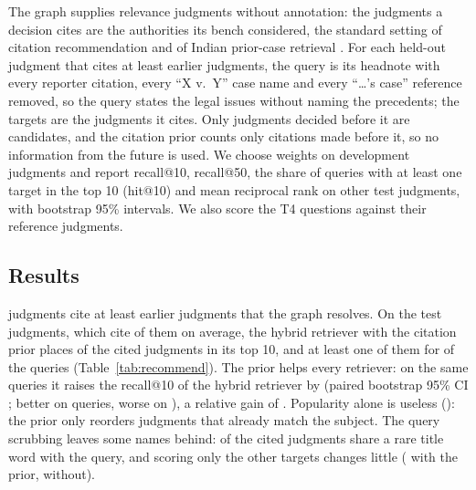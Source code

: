 \documentclass[conference]{IEEEtran}
\begin{document}
The graph supplies relevance judgments without annotation: the judgments a decision cites are the authorities its bench considered, the standard setting of citation recommendation \cite{farber2020} and of Indian prior-case retrieval \cite{joshi2023ucreat}. For each held-out judgment that cites at least \RecMinTargets{} earlier judgments, the query is its headnote with every reporter citation, every ``X v.\ Y'' case name and every ``\ldots's case'' reference removed, so the query states the legal issues without naming the precedents; the targets are the judgments it cites. Only judgments decided before it are candidates, and the citation prior counts only citations made before it, so no information from the future is used. We choose weights on \RecNDev{} development judgments and report recall@10, recall@50, the share of queries with at least one target in the top 10 (hit@10) and mean reciprocal rank on \RecNTest{} other test judgments, with bootstrap 95\% intervals. We also score the \NumTopics{} T4 questions against their reference judgments.

\subsection{Results}
\label{sec:retres}
\RecPool{} judgments cite at least \RecMinTargets{} earlier judgments that the graph resolves. On the \RecNTest{} test judgments, which cite \RecMeanTargets{} of them on average, the hybrid retriever with the citation prior places \RecHybridPriorRTenPct{} of the cited judgments in its top 10, and at least one of them for \RecHybridPriorHitTen{} of the queries (Table~\ref{tab:recommend}). The prior helps every retriever: on the same queries it raises the recall@10 of the hybrid retriever by \RecDiffPrior{} (paired bootstrap 95\% CI \RecDiffPriorCI; better on \RecDiffPriorBetter{} queries, worse on \RecDiffPriorWorse), a relative gain of \RecPriorRelGain. Popularity alone is useless (\RecPopRTen): the prior only reorders judgments that already match the subject. The query scrubbing leaves some names behind: \RecLeakStrictPct{} of the cited judgments share a rare title word with the query, and scoring only the other targets changes little (\RecHybridPriorRTenUnleaked{} with the prior, \RecHybridRTenUnleaked{} without).

\begin{table}[t]
\caption{Citation recommendation on \RecNTest{} held-out judgments: given the headnote without citations and case names, retrieve the earlier judgments it cites. R@$k$ = share of cited judgments in the top $k$; Hit@10 = share of queries with at least one in the top 10; MRR = mean reciprocal rank of the first. Weights chosen on \RecNDev{} other judgments.}
\label{tab:recommend}
\centering
\footnotesize
\setlength{\tabcolsep}{4pt}

\end{table}
\end{document}
